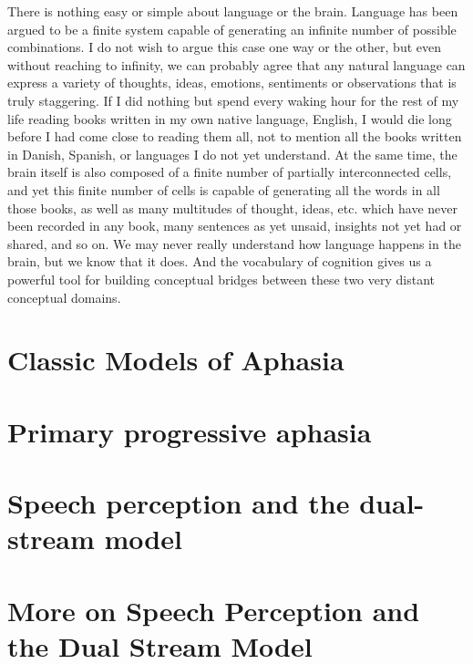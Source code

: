 \documentclass[
]{article}
\begin{document}
There is nothing easy or simple about language or the brain. Language has been argued to be a finite system capable of generating an infinite number of possible combinations. I do not wish to argue this case one way or the other, but even without reaching to infinity, we can probably agree that any natural language can express a variety of thoughts, ideas, emotions, sentiments or observations that is truly staggering. If I did nothing but spend every waking hour for the rest of my life reading books written in my own native language, English, I would die long before I had come close to reading them all, not to mention all the books written in Danish, Spanish, or languages I do not yet understand. At the same time, the brain itself is also composed of a finite number of partially interconnected cells, and yet this finite number of cells is capable of generating all the words in all those books, as well as many multitudes of thought, ideas, etc. which have never been recorded in any book, many sentences as yet unsaid, insights not yet had or shared, and so on. We may never really understand how language happens in the brain, but we know that it does. And the vocabulary of cognition gives us a powerful tool for building conceptual bridges between these two very distant conceptual domains.

\hypertarget{classic-models-of-aphasia}{%
\section{Classic Models of Aphasia}\label{classic-models-of-aphasia}}

\hypertarget{primary-progressive-aphasia}{%
\section{Primary progressive aphasia}\label{primary-progressive-aphasia}}

\hypertarget{speech-perception-and-the-dual-stream-model}{%
\section{Speech perception and the dual-stream model}\label{speech-perception-and-the-dual-stream-model}}

\hypertarget{more-on-speech-perception-and-the-dual-stream-model}{%
\section{More on Speech Perception and the Dual Stream Model}\label{more-on-speech-perception-and-the-dual-stream-model}}
\end{document}
